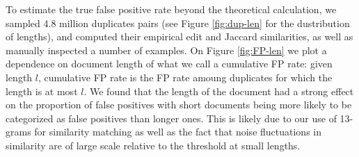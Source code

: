 \documentclass{article}
\begin{document}
To estimate the true false positive rate beyond the theoretical calculation, we sampled 4.8 million duplicates pairs (see Figure \ref{fig:dup-len} for the dustribution of lengths), and computed their empirical edit and Jaccard similarities, as well as manually inspected a number of examples. On Figure \ref{fig:FP-len} we plot a dependence on document length of what we call a cumulative FP rate: given length $l$, cumulative FP rate is the FP rate amoung duplicates for which the length is at most $l$. We found that the length of the document had a strong effect on the proportion of false positives with short documents being more likely to be categorized as false positives than longer ones. This is likely due to our use of 13-grams for similarity matching as well as the fact that noise fluctuations in similarity are of large scale relative to the threshold at small lengths.
\end{document}
